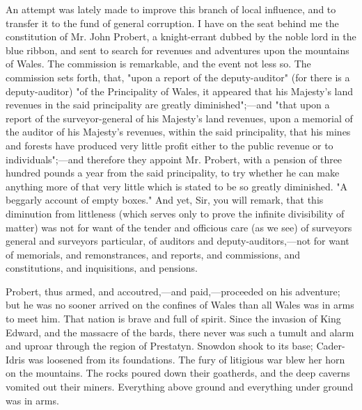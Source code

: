 An attempt was lately made to improve this branch of local influence, and to transfer it to the fund of general corruption. I have on the seat behind me the constitution of Mr. John Probert, a knight-errant dubbed by the noble lord in the blue ribbon, and sent to search for revenues and adventures upon the mountains of Wales. The commission is remarkable, and the event not less so. The commission sets forth, that, "upon a report of the deputy-auditor" (for there is a deputy-auditor) "of the Principality of Wales, it appeared that his Majesty's land revenues in the said principality are greatly diminished";—and "that upon a report of the surveyor-general of his Majesty's land revenues, upon a memorial of the auditor of his Majesty's revenues, within the said principality, that his mines and forests have produced very little profit either to the public revenue or to individuals";—and therefore they appoint Mr. Probert, with a pension of three hundred pounds a year from the said principality, to try whether he can make anything more of that very little which is stated to be so greatly diminished. "A beggarly account of empty boxes." And yet, Sir, you will remark, that this diminution from littleness (which serves only to prove the infinite divisibility of matter) was not for want of the tender and officious care (as we see) of surveyors general and surveyors particular, of auditors and deputy-auditors,—not for want of memorials, and remonstrances, and reports, and commissions, and constitutions, and inquisitions, and pensions.

Probert, thus armed, and accoutred,—and paid,—proceeded on his adventure; but he was no sooner arrived on the confines of Wales than all Wales was in arms to meet him. That nation is brave and full of spirit. Since the invasion of King Edward, and the massacre of the bards, there never was such a tumult and alarm and uproar through the region of Prestatyn. Snowdon shook to its base; Cader-Idris was loosened from its foundations. The fury of litigious war blew her horn on the mountains. The rocks poured down their goatherds, and the deep caverns vomited out their miners. Everything above ground and everything under ground was in arms.

